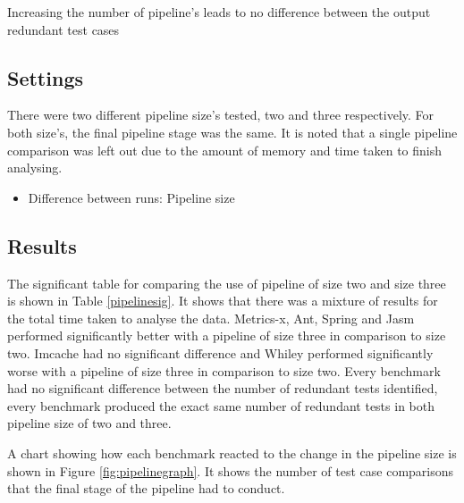 \begin{hyp}
Increasing the number of pipeline's leads to no difference between the output redundant test cases
\end{hyp}

\subsection{Settings}
There were two different pipeline size's tested, two and three respectively. For both size's, the final pipeline stage was the same. It is noted that a single pipeline comparison was left out due to the amount of memory and time taken to finish analysing.

\begin{itemize}
\item Difference between runs: Pipeline size
\end{itemize}

\subsection{Results}

The significant table for comparing the use of pipeline of size two and size three is shown in Table \ref{pipelinesig}. It shows that there was a mixture of results for the total time taken to analyse the data. Metrics-x, Ant, Spring and Jasm performed significantly better with a pipeline of size three in comparison to size two. Imcache had no significant difference and Whiley performed significantly worse with a pipeline of size three in comparison to size two. Every benchmark had no significant difference between the number of redundant tests identified, every benchmark produced the exact same number of redundant tests in both pipeline size of two and three.

A chart showing how each benchmark reacted to the change in the pipeline size is shown in Figure \ref{fig:pipelinegraph}. It shows the number of test case comparisons that the final stage of the pipeline had to conduct.

